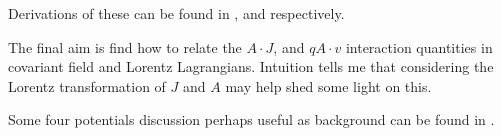 Derivations of these can be found in \cite{PJFieldLagrangian}, and \cite{PJSrLorentzForce} respectively.  

The final aim is
find how to relate the $A\cdot J$, and $q A \cdot v$ interaction quantities in covariant field and
Lorentz Lagrangians.  Intuition tells me that considering the Lorentz transformation of $J$ and $A$ may help
shed some light on this.

Some four potentials discussion perhaps useful as background can be found in \cite{PJFourPotential}.

%
%

%
